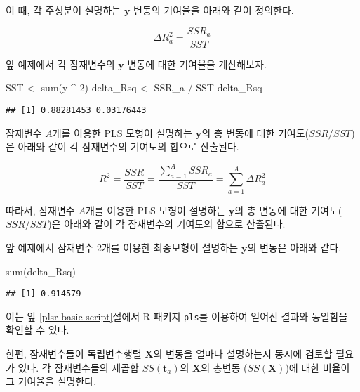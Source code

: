 \documentclass[
]{book}
\newenvironment{Shaded}{\begin{snugshade}}{\end{snugshade}}
\newcommand{\DecValTok}[1]{\textcolor[rgb]{0.00,0.00,0.81}{#1}}
\newcommand{\FunctionTok}[1]{\textcolor[rgb]{0.00,0.00,0.00}{#1}}
\newcommand{\NormalTok}[1]{#1}
\newcommand{\OtherTok}[1]{\textcolor[rgb]{0.56,0.35,0.01}{#1}}
\newcommand{\SpecialCharTok}[1]{\textcolor[rgb]{0.00,0.00,0.00}{#1}}
\begin{document}
이 때, 각 주성분이 설명하는 \(\mathbf{y}\) 변동의 기여율을 아래와 같이 정의한다.

\begin{equation}
\Delta R_a^2 = \frac{SSR_a}{SST} \label{eq:plsr-rsq}
\end{equation}

앞 예제에서 각 잠재변수의 \(\mathbf{y}\) 변동에 대한 기여율을 계산해보자.

\begin{Shaded}
\begin{Highlighting}[]
\NormalTok{SST }\OtherTok{\textless{}{-}} \FunctionTok{sum}\NormalTok{(y }\SpecialCharTok{\^{}} \DecValTok{2}\NormalTok{)}
\NormalTok{delta\_Rsq }\OtherTok{\textless{}{-}}\NormalTok{ SSR\_a }\SpecialCharTok{/}\NormalTok{ SST}
\NormalTok{delta\_Rsq}
\end{Highlighting}
\end{Shaded}

\begin{verbatim}
## [1] 0.88281453 0.03176443
\end{verbatim}

잠재변수 \(A\)개를 이용한 PLS 모형이 설명하는 \(\mathbf{y}\)의 총 변동에 대한 기여도(\(SSR / SST\))은 아래와 같이 각 잠재변수의 기여도의 합으로 산출된다.

\[
R^2 = \frac{SSR}{SST} = \frac{\sum_{a = 1}^{A} SSR_a}{SST} = \sum_{a = 1}^{A} \Delta R_a^2
\]

따라서, 잠재변수 \(A\)개를 이용한 PLS 모형이 설명하는 \(\mathbf{y}\)의 총 변동에 대한 기여도(\(SSR / SST\))은 아래와 같이 각 잠재변수의 기여도의 합으로 산출된다.

앞 예제에서 잠재변수 2개를 이용한 최종모형이 설명하는 \(\mathbf{y}\)의 변동은 아래와 같다.

\begin{Shaded}
\begin{Highlighting}[]
\FunctionTok{sum}\NormalTok{(delta\_Rsq)}
\end{Highlighting}
\end{Shaded}

\begin{verbatim}
## [1] 0.914579
\end{verbatim}

이는 앞 \ref{plsr-basic-script}절에서 R 패키지 \texttt{pls}를 이용하여 얻어진 결과와 동일함을 확인할 수 있다.

한편, 잠재변수들이 독립변수행렬 \(\mathbf{X}\)의 변동을 얼마나 설명하는지 동시에 검토할 필요가 있다. 각 잠재변수들의 제곱합 \(SS(\mathbf{t}_a)\)의 \(\mathbf{X}\)의 총변동 (\(SS(\mathbf{X})\))에 대한 비율이 그 기여율을 설명한다.
\end{document}
